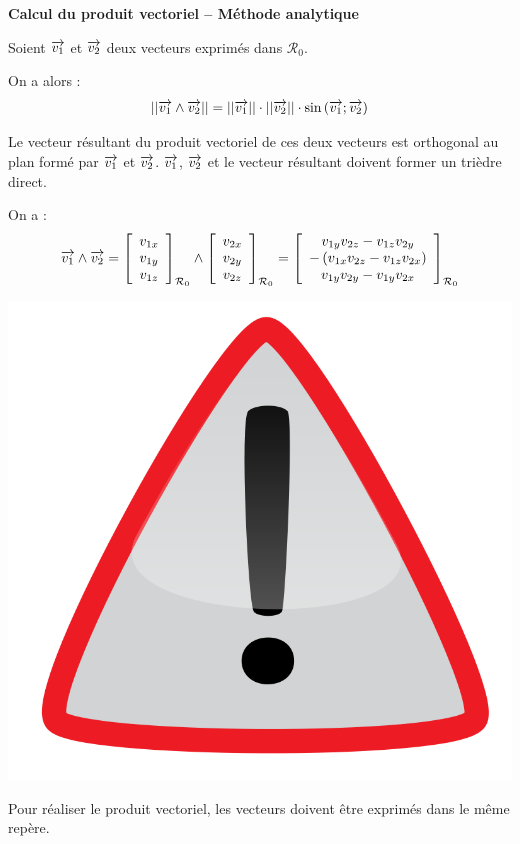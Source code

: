 \documentclass[11pt,oneside]{article}
\begin{document}
\begin{methode}
\textbf{Calcul du produit vectoriel -- Méthode analytique}

Soient $\overrightarrow{v_1}$ et $\overrightarrow{v_2}$ deux vecteurs exprimés dans $\mathcal{R}_0$. 

On a alors :
$$
||\overrightarrow{v_1} \wedge \overrightarrow{v_2}|| = ||\overrightarrow{v_1}|| \cdot ||\overrightarrow{v_2}|| \cdot \sin \left(\overrightarrow{v_1};\overrightarrow{v_2} \right) 
$$

Le vecteur résultant du produit vectoriel de ces deux vecteurs est orthogonal au plan formé par $\overrightarrow{v_1}$ et $\overrightarrow{v_2}$. $\overrightarrow{v_1}$, $\overrightarrow{v_2}$ et le vecteur résultant doivent former un trièdre direct. 

On a :
$$
\overrightarrow{v_1} \wedge \overrightarrow{v_2} 
= 
\left[
\begin{array}{c}
v_{1x}\\
v_{1y}\\
v_{1z}\\
\end{array}
\right]_{\mathcal{R}_0}
\wedge
\left[
\begin{array}{c}
v_{2x}\\
v_{2y}\\
v_{2z}\\
\end{array}
\right]_{\mathcal{R}_0}
=
\left[
\begin{array}{c}
v_{1y}v_{2z}-v_{1z}v_{2y}\\
-\left( v_{1x}v_{2z}-v_{1z}v_{2x}\right)\\
v_{1y}v_{2y}-v_{1y}v_{2x}\\
\end{array}
\right]_{\mathcal{R}_0}
$$


\begin{minipage}[c]{.15\linewidth}
\begin{center}
\includegraphics[width=.8\textwidth]{png/warning3}
\end{center}
\end{minipage} \hfill
\begin{minipage}[c]{.8\linewidth}
Pour réaliser le produit vectoriel, les vecteurs doivent être exprimés dans le même repère.
\end{minipage}
\end{methode}
\end{document}
